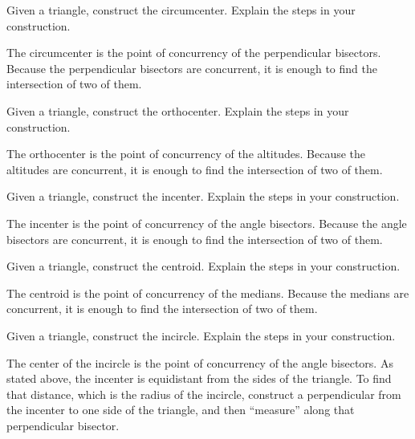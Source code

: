 \documentclass[nooutcomes]{ximera}
\begin{document}
\begin{problem}
Given a triangle, construct the circumcenter. Explain the steps
  in your construction.
\begin{freeResponse}
\begin{hint}
The circumcenter is the point of concurrency of the perpendicular bisectors.  Because the perpendicular bisectors are concurrent, it is enough to find the intersection of two of them.  
\end{hint}
\end{freeResponse}
\end{problem}

\begin{problem}
Given a triangle, construct the orthocenter. Explain the steps
  in your construction.
\begin{freeResponse}
\begin{hint}
The orthocenter is the point of concurrency of the altitudes.  Because the altitudes are concurrent, it is enough to find the intersection of two of them.  
\end{hint}
\end{freeResponse}
\end{problem}

\begin{problem}
Given a triangle, construct the incenter. Explain the steps in
  your construction.
\begin{freeResponse}
\begin{hint}
The incenter is the point of concurrency of the angle bisectors.  Because the angle bisectors are concurrent, it is enough to find the intersection of two of them.  
\end{hint}
\end{freeResponse}
\end{problem}

\begin{problem}
Given a triangle, construct the centroid. Explain the steps in
  your construction.
\begin{freeResponse}
\begin{hint}
The centroid is the point of concurrency of the medians.  Because the medians are concurrent, it is enough to find the intersection of two of them.  
\end{hint}
\end{freeResponse}
\end{problem}

\begin{problem}
Given a triangle, construct the incircle. Explain the steps in
  your construction.
\begin{freeResponse}
\begin{hint}
The center of the incircle is the point of concurrency of the angle bisectors.  As stated above, the incenter is equidistant from the sides of the triangle.  To find that distance, which is the radius of the incircle, construct a perpendicular from the incenter to one side of the triangle, and then ``measure'' along that perpendicular bisector. 
\end{hint}
\end{freeResponse}
\end{problem}
\end{document}
